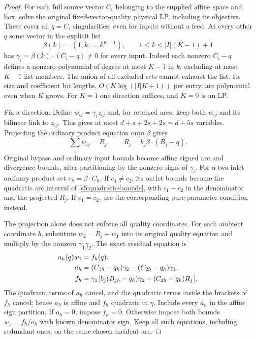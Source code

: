 \begin{proof}
For each full source vector $C_i$ belonging to the supplied affine space
and box, solve the original fixed-vector-quality physical LP, including
its objective. These cover all $q=C_i$ singularities, even for inputs
without a feed. At every other $q$ some vector in the explicit list
\begin{equation}
 \beta(k)=(1,k,\ldots,k^{K-1}),\qquad
 1\le k\le |I|(K-1)+1
 \label{s5:directions}
\end{equation}
has $\gamma_i=\beta(k)\mathbin{\cdot}(C_i-q)\ne0$ for every input.
Indeed each nonzero $C_i-q$ defines a nonzero polynomial of degree at
most $K-1$ in $k$, excluding at most $K-1$ list members. The union of
all excluded sets cannot exhaust the list. Its size and coefficient
bit lengths, $O(K\log(|I|K+1))$ per entry, are polynomial even when
$K$ grows. For $K=1$ one direction suffices, and $K=0$ is an LP.

Fix a direction. Define $w_{ij}=\gamma_i z_{ij}$ and, for retained
arcs, keep both $w_{ij}$ and its bilinear link to $z_{ij}$. This gives
at most $d+s+2s+2s=d+5s$ variables. Projecting the ordinary product
equation onto $\beta$ gives
\[
 \sum_iw_{ij}=R_j,\qquad R_j=b_j\beta\mathbin{\cdot}(B_j-q).
\]
Original bypass and ordinary input bounds become affine signed arc
and divergence bounds, after partitioning by the nonzero signs of
$\gamma_i$. For a two-inlet ordinary product set
$c_h=\beta\mathbin{\cdot}C_h$. If $c_1\ne c_2$, its outlet bounds
become the quadratic arc interval of \eqref{s5:quadratic-bounds}, with
$c_1-c_2$ in the denominator and the projected $R_j$. If $c_1=c_2$,
use the corresponding pure parameter condition instead.

The projection alone does not enforce all quality coordinates. For
each ambient coordinate $h$, substitute $w_2=R_j-w_1$ into its original
quality equation and multiply by the nonzero $\gamma_1\gamma_2$.
The exact residual equation is
\begin{align}
 a_h(q)w_1&=f_h(q),\notag\\
 a_h&=(C_{1h}-q_h)\gamma_2-(C_{2h}-q_h)\gamma_1,\notag\\
 f_h&=\gamma_1\bigl[b_j(B_{jh}-q_h)\gamma_2
                         -(C_{2h}-q_h)R_j\bigr].
 \label{s5:residual-quality}
\end{align}
The quadratic terms of $a_h$ cancel, and the quadratic terms inside
the brackets of $f_h$ cancel; hence $a_h$ is affine and $f_h$ quadratic
in $\eta$. Include every $a_h$ in the affine sign partition. If
$a_h=0$, impose $f_h=0$. Otherwise impose both bounds
$w_1=f_h/a_h$ with known denominator sign. Keep all such equations,
including redundant ones, on the same chosen incident arc.


\end{proof}
